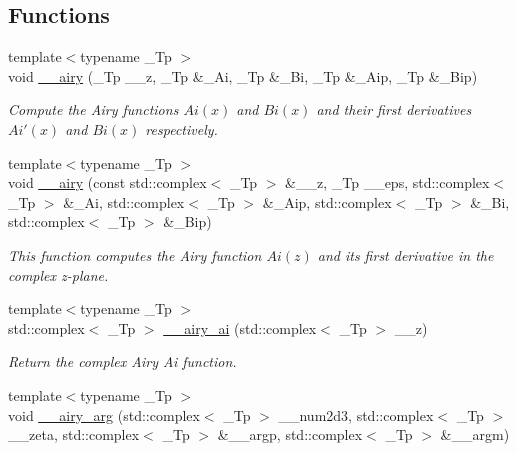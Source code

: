 \subsection*{Functions}
\begin{DoxyCompactItemize}
\item 
{\footnotesize template$<$typename \+\_\+\+Tp $>$ }\\void \hyperlink{namespacestd_1_1____detail_aaf4b5556c6d01bad1892cb1515b22c64}{\+\_\+\+\_\+airy} (\+\_\+\+Tp \+\_\+\+\_\+z, \+\_\+\+Tp \&\+\_\+\+Ai, \+\_\+\+Tp \&\+\_\+\+Bi, \+\_\+\+Tp \&\+\_\+\+Aip, \+\_\+\+Tp \&\+\_\+\+Bip)
\begin{DoxyCompactList}\small\item\em Compute the Airy functions $ Ai(x) $ and $ Bi(x) $ and their first derivatives $ Ai'(x) $ and $ Bi(x) $ respectively. \end{DoxyCompactList}\item 
{\footnotesize template$<$typename \+\_\+\+Tp $>$ }\\void \hyperlink{namespacestd_1_1____detail_a6817269a446ea93bb50e7438e27c1162}{\+\_\+\+\_\+airy} (const std\+::complex$<$ \+\_\+\+Tp $>$ \&\+\_\+\+\_\+z, \+\_\+\+Tp \+\_\+\+\_\+eps, std\+::complex$<$ \+\_\+\+Tp $>$ \&\+\_\+\+Ai, std\+::complex$<$ \+\_\+\+Tp $>$ \&\+\_\+\+Aip, std\+::complex$<$ \+\_\+\+Tp $>$ \&\+\_\+\+Bi, std\+::complex$<$ \+\_\+\+Tp $>$ \&\+\_\+\+Bip)
\begin{DoxyCompactList}\small\item\em This function computes the Airy function $ Ai(z) $ and its first derivative in the complex z-\/plane. \end{DoxyCompactList}\item 
{\footnotesize template$<$typename \+\_\+\+Tp $>$ }\\std\+::complex$<$ \+\_\+\+Tp $>$ \hyperlink{namespacestd_1_1____detail_afd48b5702344f832a250922ac4ffb917}{\+\_\+\+\_\+airy\+\_\+ai} (std\+::complex$<$ \+\_\+\+Tp $>$ \+\_\+\+\_\+z)
\begin{DoxyCompactList}\small\item\em Return the complex Airy Ai function. \end{DoxyCompactList}\item 
{\footnotesize template$<$typename \+\_\+\+Tp $>$ }\\void \hyperlink{namespacestd_1_1____detail_a2473fe60310e9480137e3b66d3944f15}{\+\_\+\+\_\+airy\+\_\+arg} (std\+::complex$<$ \+\_\+\+Tp $>$ \+\_\+\+\_\+num2d3, std\+::complex$<$ \+\_\+\+Tp $>$ \+\_\+\+\_\+zeta, std\+::complex$<$ \+\_\+\+Tp $>$ \&\+\_\+\+\_\+argp, std\+::complex$<$ \+\_\+\+Tp $>$ \&\+\_\+\+\_\+argm)

\end{DoxyCompactItemize}
